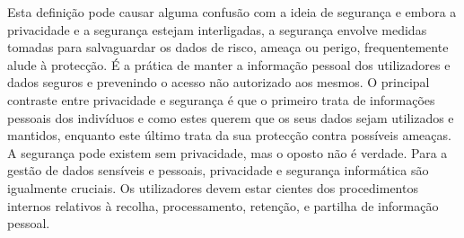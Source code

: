 \documentclass[conference]{IEEEtran}
\begin{document}

Esta definição pode causar alguma confusão com a ideia de segurança \cite{HIVDifference}
e embora a privacidade e a segurança estejam interligadas, a segurança envolve
medidas tomadas para salvaguardar os dados de risco, ameaça ou perigo, frequentemente
alude à protecção. É a prática de manter a informação pessoal dos utilizadores
e dados seguros e prevenindo o acesso não autorizado aos mesmos. O principal
contraste entre privacidade e segurança é que o primeiro trata de informações
pessoais dos indivíduos e como estes querem que os seus dados sejam utilizados
e mantidos, enquanto este último trata da sua protecção contra possíveis ameaças.
A segurança pode existem sem privacidade, mas o oposto não é verdade. Para
a gestão de dados sensíveis e pessoais, privacidade e segurança informática
são igualmente cruciais. Os utilizadores devem estar cientes dos procedimentos
internos relativos à recolha, processamento, retenção, e partilha de informação
pessoal.
\end{document}
